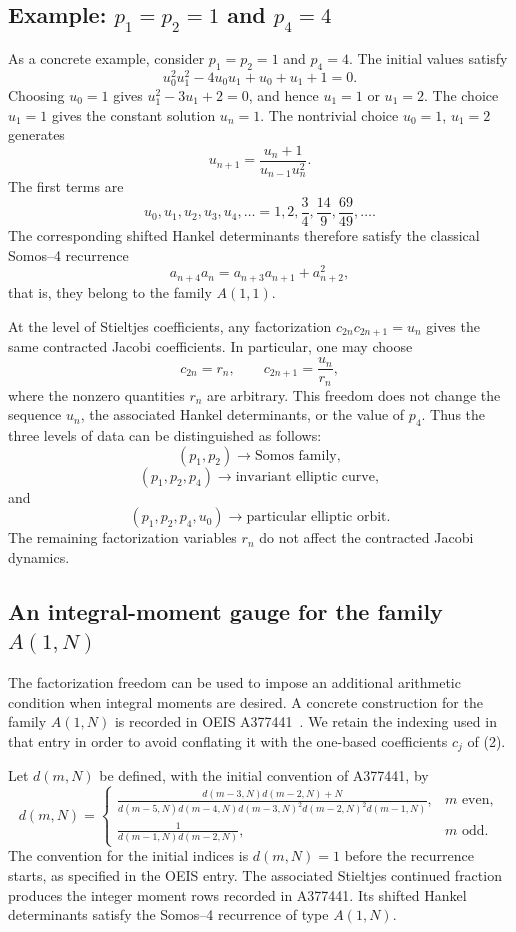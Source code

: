 \documentclass[11pt]{article}
\theoremstyle{remark}
\begin{document}
\subsection{Example: $p_1=p_2=1$ and $p_4=4$}
As a concrete example, consider $p_1=p_2=1$ and $p_4=4$. The initial values satisfy
\begin{equation}
u_0^{2}u_1^{2}-4u_0u_1+u_0+u_1+1=0.
\end{equation}
Choosing $u_0=1$ gives $u_1^2-3u_1+2=0$, and hence $u_1=1$ or $u_1=2$. The choice $u_1=1$ gives the constant solution $u_n=1$. The nontrivial choice $u_0=1$, $u_1=2$ generates
\begin{equation}
u_{n+1}=\frac{u_n+1}{u_{n-1}u_n^{2}}.
\end{equation}
The first terms are
\[
u_0,u_1,u_2,u_3,u_4,\ldots=1,2,\frac34,\frac{14}{9},\frac{69}{49},\ldots.
\]
The corresponding shifted Hankel determinants therefore satisfy the classical Somos--4 recurrence
\[
a_{n+4}a_n=a_{n+3}a_{n+1}+a_{n+2}^{2},
\]
that is, they belong to the family $A(1,1)$.

At the level of Stieltjes coefficients, any factorization $c_{2n}c_{2n+1}=u_n$ gives the same contracted Jacobi coefficients. In particular, one may choose
\[
c_{2n}=r_n,\qquad c_{2n+1}=\frac{u_n}{r_n},
\]
where the nonzero quantities $r_n$ are arbitrary. This freedom does not change the sequence $u_n$, the associated Hankel determinants, or the value of $p_4$.
Thus the three levels of data can be distinguished as follows:
\[
(p_1,p_2)\longrightarrow\text{Somos family},
\]
\[
(p_1,p_2,p_4)\longrightarrow\text{invariant elliptic curve},
\]
and
\[
(p_1,p_2,p_4,u_0)\longrightarrow\text{particular elliptic orbit}.
\]
The remaining factorization variables $r_n$ do not affect the contracted Jacobi dynamics.

\subsection{An integral-moment gauge for the family $A(1,N)$}

The factorization freedom can be used to impose an additional arithmetic
condition when integral moments are desired. A concrete construction for the
family $A(1,N)$ is recorded in OEIS A377441~\cite{A377441}. We retain the
indexing used in that entry in order to avoid conflating it with the one-based
coefficients $c_j$ of (2).

Let $d(m,N)$ be defined, with the initial convention of A377441, by
\begin{equation}
 d(m,N)=
 \begin{cases}
 \displaystyle
 \frac{d(m-3,N)d(m-2,N)+N}
 {d(m-5,N)d(m-4,N)d(m-3,N)^2d(m-2,N)^2d(m-1,N)},
 &m\text{ even},\\[1.2em]
 \displaystyle
 \frac{1}{d(m-1,N)d(m-2,N)},
 &m\text{ odd}.
 \end{cases}
\end{equation}
The convention for the initial indices is $d(m,N)=1$ before the recurrence
starts, as specified in the OEIS entry. The associated Stieltjes continued
fraction produces the integer moment rows recorded in A377441. Its shifted
Hankel determinants satisfy the Somos--4 recurrence of type $A(1,N)$.
\end{document}
